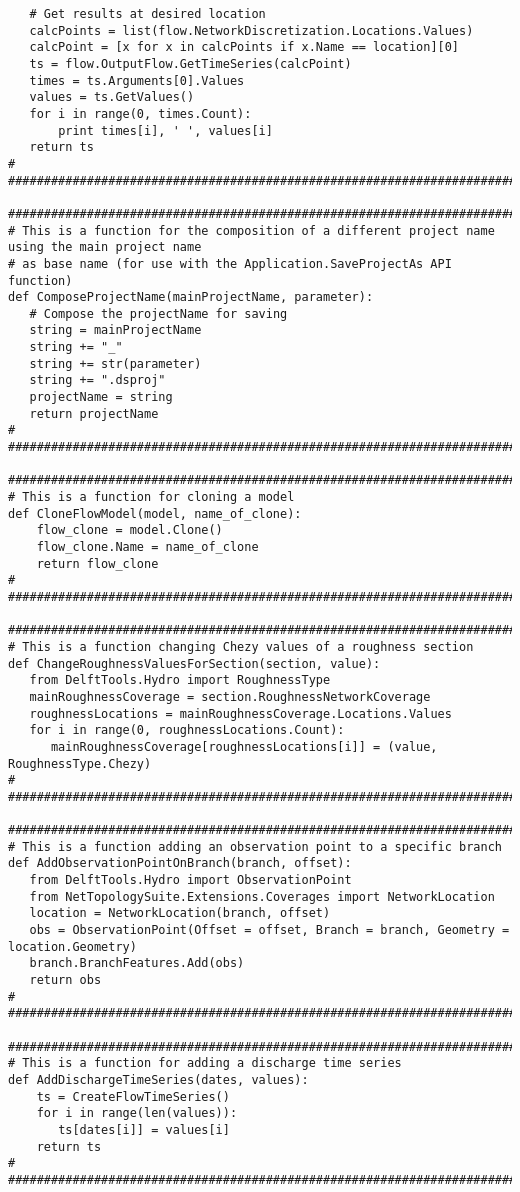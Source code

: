 {\begin{verbatim}
   # Get results at desired location
   calcPoints = list(flow.NetworkDiscretization.Locations.Values)
   calcPoint = [x for x in calcPoints if x.Name == location][0]
   ts = flow.OutputFlow.GetTimeSeries(calcPoint)
   times = ts.Arguments[0].Values
   values = ts.GetValues()
   for i in range(0, times.Count):
       print times[i], ' ', values[i]
   return ts
#
###################################################################################################

###################################################################################################
# This is a function for the composition of a different project name using the main project name
# as base name (for use with the Application.SaveProjectAs API function)
def ComposeProjectName(mainProjectName, parameter):
   # Compose the projectName for saving
   string = mainProjectName
   string += "_" 
   string += str(parameter)
   string += ".dsproj"
   projectName = string
   return projectName
#
###################################################################################################

###################################################################################################
# This is a function for cloning a model
def CloneFlowModel(model, name_of_clone):
    flow_clone = model.Clone()
    flow_clone.Name = name_of_clone
    return flow_clone
#
###################################################################################################

###################################################################################################
# This is a function changing Chezy values of a roughness section
def ChangeRoughnessValuesForSection(section, value):
   from DelftTools.Hydro import RoughnessType
   mainRoughnessCoverage = section.RoughnessNetworkCoverage
   roughnessLocations = mainRoughnessCoverage.Locations.Values
   for i in range(0, roughnessLocations.Count):
      mainRoughnessCoverage[roughnessLocations[i]] = (value, RoughnessType.Chezy)
#
###################################################################################################

###################################################################################################
# This is a function adding an observation point to a specific branch
def AddObservationPointOnBranch(branch, offset):
   from DelftTools.Hydro import ObservationPoint
   from NetTopologySuite.Extensions.Coverages import NetworkLocation
   location = NetworkLocation(branch, offset)
   obs = ObservationPoint(Offset = offset, Branch = branch, Geometry = location.Geometry)
   branch.BranchFeatures.Add(obs)
   return obs
#
###################################################################################################

###################################################################################################
# This is a function for adding a discharge time series
def AddDischargeTimeSeries(dates, values):
    ts = CreateFlowTimeSeries()
    for i in range(len(values)):
       ts[dates[i]] = values[i]
    return ts
#
####################################################################################################
\end{verbatim}
} %